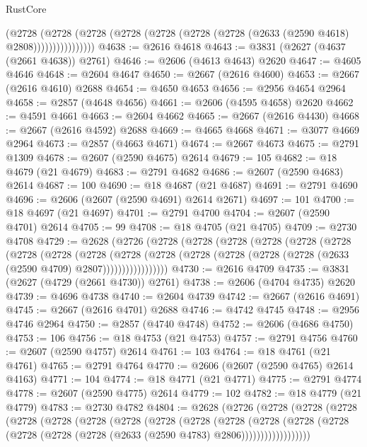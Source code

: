 \begin{lexlean}{RustCore}
\begin{coremodule}
                    (@2728
                      (@2728
                        (@2728
                          (@2728 (@2728 (@2728 (@2728 (@2633 (@2590 @4618) @2808))))))))))))))))
@4638 := @2616 @4618
@4643 := @3831 (@2627 (@4637 (@2661 @4638)) @2761)
@4646 := @2606 (@4613 @4643) @2620
@4647 := @4605 @4646
@4648 := @2604 @4647
@4650 := @2667 (@2616 @4600)
@4653 := @2667 (@2616 @4610) @2688
@4654 := @4650 @4653
@4656 := @2956 @4654 @2964
@4658 := @2857 (@4648 @4656)
@4661 := @2606 (@4595 @4658) @2620
@4662 := @4591 @4661
@4663 := @2604 @4662
@4665 := @2667 (@2616 @4430)
@4668 := @2667 (@2616 @4592) @2688
@4669 := @4665 @4668
@4671 := @3077 @4669 @2964
@4673 := @2857 (@4663 @4671)
@4674 := @2667 @4673
@4675 := @2791 @1309
@4678 := @2607 (@2590 @4675) @2614
@4679 := 105
@4682 := @18 @4679 (@21 @4679)
@4683 := @2791 @4682
@4686 := @2607 (@2590 @4683) @2614
@4687 := 100
@4690 := @18 @4687 (@21 @4687)
@4691 := @2791 @4690
@4696 := @2606 (@2607 (@2590 @4691) @2614 @2671)
@4697 := 101
@4700 := @18 @4697 (@21 @4697)
@4701 := @2791 @4700
@4704 := @2607 (@2590 @4701) @2614
@4705 := 99
@4708 := @18 @4705 (@21 @4705)
@4709 := @2730 @4708
@4729 := @2628
    (@2726
      (@2728
        (@2728
          (@2728
            (@2728
              (@2728
                (@2728
                  (@2728
                    (@2728
                      (@2728
                        (@2728
                          (@2728
                            (@2728 (@2728 (@2728 (@2728 (@2633 (@2590 @4709) @2807)))))))))))))))))
@4730 := @2616 @4709
@4735 := @3831 (@2627 (@4729 (@2661 @4730)) @2761)
@4738 := @2606 (@4704 @4735) @2620
@4739 := @4696 @4738
@4740 := @2604 @4739
@4742 := @2667 (@2616 @4691)
@4745 := @2667 (@2616 @4701) @2688
@4746 := @4742 @4745
@4748 := @2956 @4746 @2964
@4750 := @2857 (@4740 @4748)
@4752 := @2606 (@4686 @4750)
@4753 := 106
@4756 := @18 @4753 (@21 @4753)
@4757 := @2791 @4756
@4760 := @2607 (@2590 @4757) @2614
@4761 := 103
@4764 := @18 @4761 (@21 @4761)
@4765 := @2791 @4764
@4770 := @2606 (@2607 (@2590 @4765) @2614 @4163)
@4771 := 104
@4774 := @18 @4771 (@21 @4771)
@4775 := @2791 @4774
@4778 := @2607 (@2590 @4775) @2614
@4779 := 102
@4782 := @18 @4779 (@21 @4779)
@4783 := @2730 @4782
@4804 := @2628
    (@2726
      (@2728
        (@2728
          (@2728
            (@2728
              (@2728
                (@2728
                  (@2728
                    (@2728
                      (@2728
                        (@2728
                          (@2728
                            (@2728
                              (@2728
                                (@2728 (@2728 (@2728 (@2633 (@2590 @4783) @2806))))))))))))))))))

\end{coremodule}
\end{lexlean}
